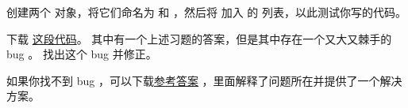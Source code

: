 \begin{exercise}


创建两个  对象，将它们命名为  和  ，然后将  加入  的  列表，以此测试你写的代码。

下载 \href{http://thinkpython2.com/code/BadKangaroo.py}{这段代码}。
其中有一个上述习题的答案，但是其中存在一个又大又棘手的 bug 。
找出这个 bug 并修正。

如果你找不到 bug ，可以下载\href{http://thinkpython2.com/code/GoodKangaroo.py}{参考答案} ，里面解释了问题所在并提供了一个解决方案。


\end{exercise}

